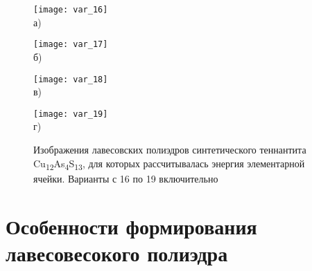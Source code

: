 \begin{figure}[p!]
  \begin{minipage}[ht]{0.45\linewidth}\centering
    \texttt{[image: var\_16]} \\ а)
  \end{minipage}
						\hfill
 \begin{minipage}[ht]{0.45\linewidth}\centering
    \texttt{[image: var\_17]} \\ б)
  \end{minipage}
\vfill

  \begin{minipage}[ht]{0.45\linewidth}\centering
    \texttt{[image: var\_18]} \\ в)
  \end{minipage}
						\hfill
 \begin{minipage}[ht]{0.45\linewidth}\centering
    \texttt{[image: var\_19]} \\ г)
  \end{minipage}
\vfill

  \begin{minipage}[ht]{0.45\linewidth}\centering

  \end{minipage}
						\hfill
 \begin{minipage}[ht]{0.45\linewidth}\centering

  \end{minipage}
      \caption[Изображения лавесовских полиэдров синтетического теннантита Cu\textsubscript{12}As\textsubscript{4}S\textsubscript{13}, для которых рассчитывалась энергия элементарной ячейки. Варианты с 16 по 19 включительно]{Изображения лавесовских полиэдров синтетического теннантита Cu\textsubscript{12}As\textsubscript{4}S\textsubscript{13}, для которых рассчитывалась энергия элементарной ячейки. Варианты с 16 по 19 включительно}
    \label{img:laves4}
\end{figure}



\newpage

\clearpage

\section{Особенности формирования лавесовесокого полиэдра} \label{sect3_5}

